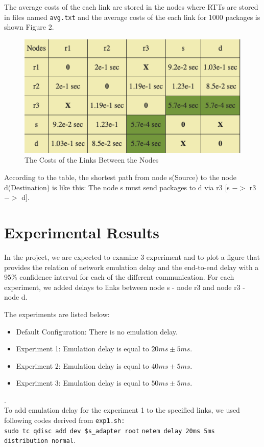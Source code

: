 \documentclass[conference]{IEEEtran}
\begin{document}
The average costs of the each link are stored in the nodes where RTTs are stored in files named \verb|avg.txt| and the average costs of the each link for 1000 packages is shown Figure 2.

\begin{figure}[h]
    \centering
    \includegraphics[width=8 cm, height=4 cm]{RTT-table.png}
    \caption{The Costs of the Links Between the Nodes}
    \label{fig}
\end{figure}

According to the table, the shortest path from node s(Source) to the node d(Destination) is like this: The node s must send packages to d via r3 [s $->$ r3 $->$ d]. \\

\section{Experimental Results}

In the project, we are expected to examine 3 experiment and to plot a figure that provides the relation of network emulation delay and the end-to-end delay with a 95\% confidence interval for each of the different communication. For each experiment, we added delays to links between node s - node r3 and node r3 - node d.

The experiments are listed below:
\begin{itemize}
    \item Default Configuration: There is no emulation delay.
    \item Experiment 1: Emulation delay is equal to $20ms\pm5ms$.
    \item Experiment 2: Emulation delay is equal to $40ms\pm5ms$.
    \item Experiment 3: Emulation delay is equal to $50ms\pm5ms$.

\end{itemize}.\\

To add emulation delay for the experiment 1 to the specified links, we used following codes derived from \verb|exp1.sh:|\\
\verb|sudo tc qdisc add dev $s_adapter root| \verb|netem delay 20ms 5ms distribution normal|.
\end{document}
